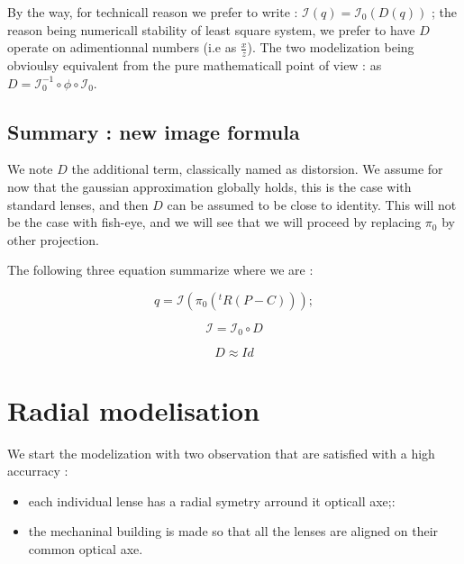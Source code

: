 By the way, for technicall reason we prefer to write : $ \mathcal{I}(q) = \mathcal{I}_0(D(q)) $ ; 
the reason being numericall stability of least square system, we prefer to have $D$ operate on adimentionnal numbers
(i.e as $\frac{x}{z}$).  The two modelization being obvioulsy equivalent from the pure mathematicall point of view :
as $D= \mathcal{I}_0^{-1} \circ \phi \circ  \mathcal{I}_0$.


\subsection{Summary : new image formula}

We note $D$ the additional term, classically named as distorsion. We assume for now that the gaussian approximation
globally holds,  this is the case with standard lenses, and then $D$ can be assumed to be close to identity.
This will not be the case with fish-eye, and we will see that we will proceed by replacing $\pi_0$ by other
projection.

The following three equation summarize where we are :



\begin{equation}
	q  =   \mathcal{I} (\pi_0 (^t R (P - C))) ; \label{FormImage1}
\end{equation}

\begin{equation}
	 \mathcal{I} = \mathcal{I}_0  \circ D
\end{equation}

\begin{equation}
	  D \approx Id
\end{equation}


\section{Radial modelisation}

We start the modelization with two observation that are satisfied with a
high accurracy :

\begin{itemize}
    \item  each individual lense has a radial symetry arround it opticall axe;:
    \item  the mechaninal building is made so that all the lenses are aligned on
	    their common optical axe.
\end{itemize}


